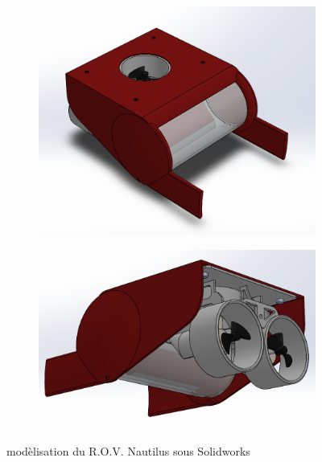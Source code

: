 \documentclass[a4paper,11pt]{report}
\begin{document}
					\begin{figure}[!h]
						\centering
							\begin{subfigure}[b]{0.5\textwidth}
								\includegraphics[width=\textwidth]{Photos/Capture1.png}
							\end{subfigure}
							\begin{subfigure}[b]{0.5\textwidth}
								\includegraphics[width=\textwidth]{Photos/Capture2.png}
							\end{subfigure}
							\caption{modèlisation du R.O.V. Nautilus sous Solidworks}
					\end{figure}\newline
					
\end{document}
